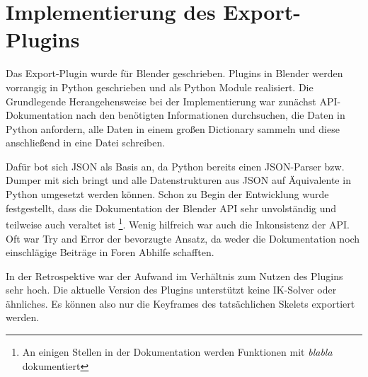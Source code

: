 \chapter{Implementierung des Export-Plugins}
Das Export-Plugin wurde für Blender geschrieben. Plugins in Blender werden vorrangig in Python geschrieben und als Python Module realisiert. Die Grundlegende Herangehensweise bei der Implementierung war zunächst API-Dokumentation nach den benötigten Informationen durchsuchen, die Daten in Python anfordern, alle Daten in einem großen Dictionary sammeln und diese anschließend in eine Datei schreiben.

Dafür bot sich JSON als Basis an, da Python bereits einen JSON-Parser bzw. Dumper mit sich bringt und alle Datenstrukturen aus JSON auf Äquivalente in Python umgesetzt werden können. Schon zu Begin der Entwicklung wurde festgestellt, dass die Dokumentation der Blender API sehr unvolständig und teilweise auch veraltet ist \footnote{An einigen Stellen in der Dokumentation werden Funktionen mit \textit{blabla} dokumentiert}. Wenig hilfreich war auch die Inkonsistenz der API. Oft war Try and Error der bevorzugte Ansatz, da weder die Dokumentation noch einschlägige Beiträge in Foren Abhilfe schafften.

In der Retrospektive war der Aufwand im Verhältnis zum Nutzen des Plugins sehr hoch. Die aktuelle Version des Plugins unterstützt keine IK-Solver oder ähnliches. Es können also nur die Keyframes des tatsächlichen Skelets exportiert werden.
